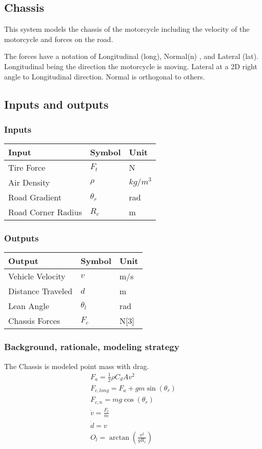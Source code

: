 \documentclass[../SimBALink.tex]{subfiles}
\begin{document}
\subsection{Chassis} This system models the chassis of the motorcycle including the velocity of the motorcycle and forces on the road.

The forces have a notation of Longitudinal (long), Normal(n) , and Lateral (lat). Longitudinal being the direction the motorcycle is moving. Lateral at a 2D right angle to Longitudinal direction. Normal is orthogonal to others. 

\subsection{Inputs and outputs}
	\subsubsection{Inputs}
	\begin{tabular}{ l | l | l  }
		Input					&	Symbol		&	Unit		\\	\hline
		Tire Force				& 	$F_t$ 		&	N \\		
		Air Density 			&	$\rho$		& $kg/m^3$ \\
		Road Gradient			&	$\theta_r$  & rad \\
		Road Corner Radius		&	$R_c$		& m
	\end{tabular}
	
	\subsubsection{Outputs}
	\begin{tabular}{ l | l | l  }
		Output					&	Symbol		&	Unit		\\	\hline
		Vehicle Velocity		&	$v$			&	m/s \\
		Distance Traveled		&	$d$			&	m \\
		Lean Angle 				&	$\theta_l$	&   rad	\\
		Chassis Forces			&	$F_c$		&	N[3]
	\end{tabular}

\subsubsection{Background, rationale, modeling strategy}
The Chassis is modeled point mass with drag.
\begin{gather}
		F_a = \frac{1}{2} \rho C_dAv^2 \\
		F_{c,long}  = F_a + gm\sin(\theta_r)  \\
		F_{c,n} = mg\cos(\theta_r) \\
		\dot{v} = \frac{F_t}{m} \\
		\dot{d} = v \\
		O_l = \arctan(\frac{v^2}{gR_c})
\end{gather}
\end{document}
